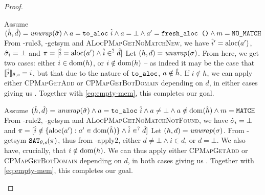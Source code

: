 \begin{proof}

\begin{hypvlist}
 Assume $(\hat{h},\hat{d})={\operatorname{\mathit{unwrap}}}(\hat{\sigma}) \land a = \texttt{to\_aloc}~\hat{i} \land a = \bot \land a'=\texttt{fresh\_aloc ()} \land m=\texttt{NO\_MATCH}$
 From \hyp{rule3}, \hyp{getsym} and \textsc{ALocPMapGetNoMatchNew}, we have $\hat{i}'=\text{aloc}(a')$, $\hat{\sigma}_i=\bot$ and ${\pi=[\hat{i}=\text{aloc}(a')\land \hat{i}\in^?\hat{d}]}$
 Let $(h,d)={\operatorname{\mathit{unwrap}}}(\sigma)$.%
 From here, we get two cases: either $i\in \operatorname{dom}(h)$, or $i\notin \operatorname{dom}(h)$ -- as indeed it may be the case that $\llbracket\hat{i}\rrbracket_{\theta,s}=i$, but that due to the nature of $\texttt{to\_aloc}$, $a\notin \hat{h}$.
 If $i\notin h$, we can apply either \textsc{CPMapGetAdd} or \textsc{CPMapGetBotDomain} depending on $d$, in either cases giving us . Together with \ref{eq:empty-mem}, this completes our goal.
\end{hypvlist}


\begin{hypvlist}
 Assume $(\hat{h},\hat{d})={\operatorname{\mathit{unwrap}}}(\hat{\sigma}) \land a = \texttt{to\_aloc}~\hat{i} \land a \neq \bot \land a\notin\operatorname{dom}(\hat{h}) \land m=\texttt{MATCH}$
 From \hyp{rule2}, \hyp{getsym} and \textsc{ALocPMapGetNoMatchNotFound}, we have $\hat{\sigma}_i=\bot$ and ${\pi=[\hat{i} \notin \{\text{aloc}(a'):a'\in \operatorname{dom}(\hat{h})\} \land \hat{i} \in^? \hat{d}]}$%
 Let $(h,d)={\operatorname{\mathit{unwrap}}}(\sigma)$.
 From \hyp{getsym} $\texttt{SAT}_{\mathit{\theta,s}}(\pi)$, thus from \hyp{apply2}, either $d\neq\bot\land i\in d$, or $d=\bot$. We also have, crucially, that $i\notin \operatorname{dom}(h)$.
 We can thus apply either \textsc{CPMapGetAdd} or \textsc{CPMapGetBotDomain} depending on $d$, in both cases giving us . Together with \ref{eq:empty-mem}, this completes our goal.
\end{hypvlist}



\end{proof}
